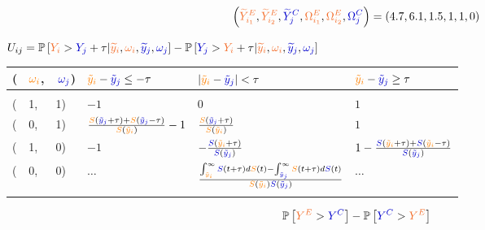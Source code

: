 \documentclass[12pt]{article}
\theoremstyle{definition}
\newcommand{\darkblue}{blue!80!black}
\newcommand{\Ysurv}{\textcolor{\darkblue}{S}}
\newcommand{\yobs}{\textcolor{\darkblue}{\tilde{y}_j}}
\newcommand{\Ycens}{\textcolor{\darkblue}{\omega_j}}
\newcommand{\Xsurv}{\textcolor{orange}{S}}
\newcommand{\xobs}{\textcolor{orange}{\tilde{y}_i}}
\newcommand{\Xcens}{\textcolor{orange}{\omega_i}}
\begin{document}
\begin{align*}
\left(
\textcolor{Orange}{\widetilde{Y}^E_{i_1}},
\textcolor{Orange}{\widetilde{Y}^E_{i_2}},
\textcolor{\darkblue}{\widetilde{Y}^C_{j}},
\textcolor{Orange}{\Omega^E_{i_1}},
\textcolor{Orange}{\Omega^E_{i_2}},
\textcolor{\darkblue}{\Omega^C_{j}}
\right) = (4.7,6.1,1.5,1,1,0)
\end{align*}

\(U_{ij}=\mathbb{P}\left[\textcolor{Orange}{Y_{i}}>\textcolor{\darkblue}{Y_{j}}+\tau|\textcolor{Orange}{\widetilde{y}_{i}},\textcolor{Orange}{\omega_i},\textcolor{\darkblue}{\widetilde{y}_{j}},\textcolor{\darkblue}{\omega_j}\right]-\mathbb{P}\left[\textcolor{\darkblue}{Y_{j}}>\textcolor{Orange}{Y_{i}}+\tau|\textcolor{Orange}{\widetilde{y}_{i}},\textcolor{Orange}{\omega_i},\textcolor{\darkblue}{\widetilde{y}_{j}},\textcolor{\darkblue}{\omega_j}\right]\)
\begin{table}[!ht]
	\centering
	\begin{tabular}{l@{}l@{}l|lll}
		(&$\Xcens$, & $\, \Ycens$) & $\xobs - \yobs \leq -\tau$ & $ |\xobs-\yobs| < \tau$ & $\xobs - \yobs \geq \tau$ \\ \hline 
		&&&&&\\ [-3mm]
		(&1,&1) & \(-1\) & \(0\) & \(1\) \\ [4mm]
		(&0,&1) & \(\frac{\Xsurv(\yobs+\tau)+\Xsurv(\yobs-\tau)}{\Xsurv(\xobs)}-1\) & $\frac{\Xsurv(\yobs + \tau)}{\Xsurv(\xobs)}$ & \(1\) \\ [4mm]
		(&1,&0) & \(-1\) &  $-\frac{\Ysurv(\xobs + \tau)}{\Ysurv(\yobs)}$ & \(1-\frac{\Ysurv(\xobs+\tau)+\Ysurv(\xobs-\tau)}{\Ysurv(\yobs)}\) \\ [4mm]
		(&0,&0) & \(\ldots\)
		& \(\frac{\int_{\xobs}^{\infty} \Ysurv(t+\tau)d\Xsurv(t)-\int_{\yobs}^{\infty} \Xsurv(t+\tau)d\Ysurv(t)}{\Xsurv(\xobs)\Ysurv(\yobs)}\)
		& \(\ldots\)
		\\ [-4mm]
		&&&&&\\ \hline
	\end{tabular}
\end{table}

\begin{align*}
	\mathbb{P}\left[\textcolor{Orange}{Y^E}>\textcolor{\darkblue}{Y^C}\right]-\mathbb{P}\left[\textcolor{\darkblue}{Y^C}>\textcolor{Orange}{Y^E}\right]
\end{align*}
\end{document}
